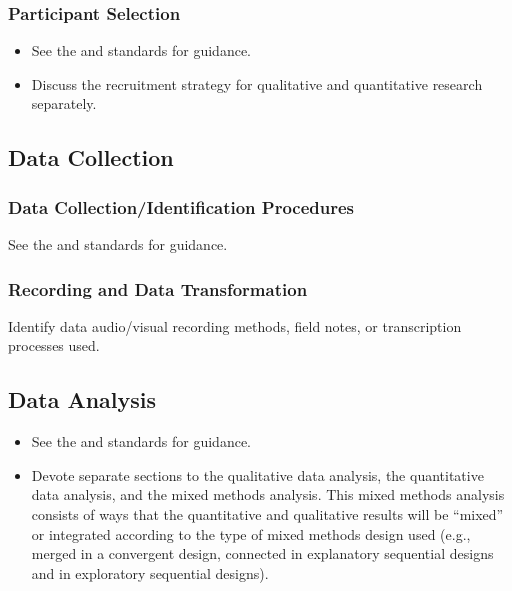 \documentclass[acmsmall]{acmart}
\begin{document}
\subsubsection{Participant Selection}
\begin{itemize}
\item See the \hyperlink{https://apastyle.apa.org/jars/quantitative}{\color{blue}{JARS-QUANT}} and \hyperlink{https://apastyle.apa.org/jars/qualitative}{\color{blue}{JARS-QUAL}} standards for guidance.
\item Discuss the recruitment strategy for qualitative and quantitative research separately.
\end{itemize}

\subsection{Data Collection}

\subsubsection{Data Collection/Identification Procedures}

See the \hyperlink{https://apastyle.apa.org/jars/quantitative}{\color{blue}{JARS-QUANT}} and \hyperlink{https://apastyle.apa.org/jars/qualitative}{\color{blue}{JARS-QUAL}} standards for guidance.

\subsubsection{Recording and Data Transformation}

Identify data audio/visual recording methods, field notes, or transcription processes used.

\subsection{Data Analysis}
\begin{itemize}
\item See the \hyperlink{https://apastyle.apa.org/jars/quantitative}{\color{blue}{JARS-QUANT}} and \hyperlink{https://apastyle.apa.org/jars/qualitative}{\color{blue}{JARS-QUAL}} standards for guidance.
\item Devote separate sections to the qualitative data analysis, the quantitative data analysis, and the mixed methods analysis. This mixed methods analysis consists of ways that the quantitative and qualitative results will be “mixed” or integrated according to the type of mixed methods design used (e.g., merged in a convergent design, connected in explanatory sequential designs and in exploratory sequential designs).
\end{itemize}
\end{document}
